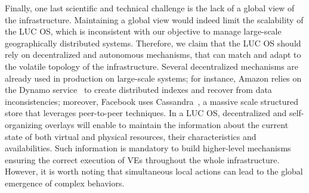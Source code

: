  Finally, one last scientific and
technical challenge is the lack of a global view of the infrastructure.  Maintaining a
global view would indeed limit the scalability of the LUC OS, which is inconsistent with
our objective to manage large-scale geographically distributed systems.  Therefore, we
claim that the LUC OS should rely on decentralized and autonomous mechanisms, that can
match and adapt to the volatile topology of the infrastructure.  Several decentralized
mechanisms are already used in production on large-scale systems; for instance, Amazon
relies on the Dynamo service~\cite{decandia:2007} to create distributed indexes and
recover from data inconsistencies; moreover, Facebook uses Cassandra~\cite{lakshman:2010},
a massive scale structured store that leverages peer-to-peer techniques.
%
%
In a LUC OS, decentralized and self-organizing overlays will enable to maintain the
information about the current state of both virtual and physical resources, their
characteristics and availabilities. Such information is mandatory to build higher-level
mechanisms ensuring the correct execution of VEs throughout the whole infrastructure.
However, it is worth noting that simultaneous local actions can lead to the global
emergence of complex behaviors.


